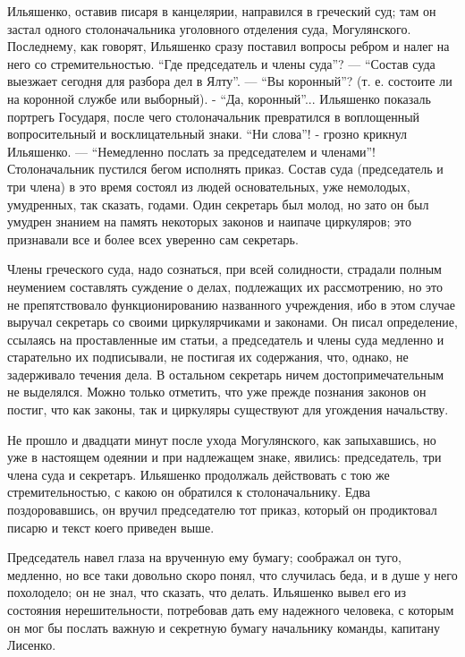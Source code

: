 \documentclass[a4paper,20pt]{report}
\begin{document}
Ильяшенко, оставив писаря в канцелярии, направился
в греческий суд; там он застал одного столоначальника
уголовного отделения суда, Могулянского. Последнему, как
говорят, Ильяшенко сразу поставил вопросы ребром и
налег на него со стремительностью. ``Где председатель и
члены суда''? — ``Состав суда выезжает сегодня для разбора
дел в Ялту''. — ``Вы коронный''? (т. е. состоите ли на 
коронной службе или выборный). - ``Да, коронный''... Ильяшенко
показаль портрегь Государя, после чего столоначальник
превратился в воплощенный вопросительный и восклицательный знаки. ``Ни слова''! - грозно крикнул Ильяшенко. —
``Немедленно послать за председателем и членами''! Столоначальник пустился
бегом исполнять приказ. Состав суда (председатель и три члена) в это
время состоял из людей основательных, уже немолодых, умудренных, так
сказать, годами. Один секретарь был молод, но зато он был умудрен
знанием на память некоторых законов и наипаче циркуляров; это
признавали все и более всех уверенно сам секретарь.

Члены греческого суда, надо сознаться, при всей солидности, страдали полным
неумением составлять суждение о делах, подлежащих их рассмотрению, но
это не препятствовало функционированию названного учреждения, ибо в
этом случае выручал секретарь со своими циркулярчиками и законами. Он
писал определение, ссылаясь на проставленные им статьи, а председатель
и члены суда медленно и старательно их подписывали, не постигая их
содержания, что, однако, не задерживало течения дела. В остальном
секретарь ничем достопримечательным не выделялся.  Можно только
отметить, что уже прежде познания законов он постиг, что как законы,
так и циркуляры существуют для угождения начальству.

Не прошло и двадцати минут после ухода Могулянского, как запыхавшись, но уже в
настоящем одеянии и при надлежащем знаке, явились: председатель, три
члена суда и секретаръ. Ильяшенко продолжаль действовать с тою же
стремительностью, с какою он обратился к столоначальнику. Едва
поздоровавшись, он вручил председателю тот приказ, который он
продиктовал писарю и текст коего приведен выше.

Председатель навел глаза на врученную ему бумагу; соображал он туго, медленно, но все таки довольно
скоро понял, что случилась беда, и в душе у него похолодело;
он не знал, что сказать, что делать. Ильяшенко вывел
его из состояния нерешительности, потребовав дать ему
надежного человека, с которым он мог бы послать важную и секретную бумагу
начальнику команды, капитану Лисенко.
\end{document}

